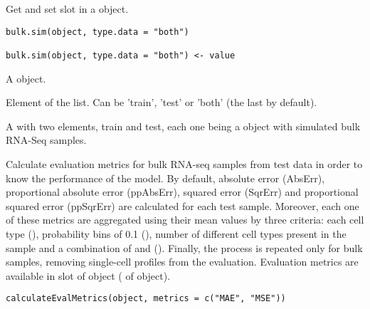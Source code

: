 \documentclass[a4paper]{book}
\begin{document}
%
\begin{Description}\relax
Get and set  slot in a 
object.
\end{Description}
%
\begin{Usage}
\begin{verbatim}
bulk.sim(object, type.data = "both")

bulk.sim(object, type.data = "both") <- value
\end{verbatim}
\end{Usage}
%
\begin{Arguments}
\begin{ldescription}
\item[\code{object}] A  object.

\item[\code{type.data}] Element of the list. Can be 'train', 'test' or 'both' (the
last by default).

\item[\code{value}] A  with two elements, train and test, each one being
a  object with simulated bulk RNA-Seq samples.
\end{ldescription}
\end{Arguments}
%
\begin{Description}\relax
Calculate evaluation metrics for bulk RNA-seq samples from test data in order
to know the performance of the model. By default, absolute error (AbsErr),
proportional absolute error (ppAbsErr), squared error (SqrErr) and
proportional squared error (ppSqrErr) are calculated for each test sample.
Moreover, each one of these metrics are aggregated using their mean values by
three criteria: each cell type (), probability bins of 0.1
(), number of different cell types present in the sample
 and a combination of  and 
(). Finally, the process is repeated only for bulk samples,
removing single-cell profiles from the evaluation. Evaluation metrics are
available in  slot of 
object ( of  object).
\end{Description}
%
\begin{Usage}
\begin{verbatim}
calculateEvalMetrics(object, metrics = c("MAE", "MSE"))
\end{verbatim}
\end{Usage}
\end{document}
